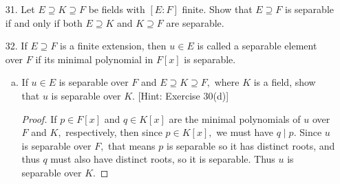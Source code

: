\documentclass{article}
\begin{document}
\begin{itemize}
\begin{enumerate}[(a)]
			\item If $E=F(E^p)$ and $\left\{ w_1, \cdots, w_k \right\}\subseteq E$ is $F$-independent, show that $\left\{ w_1^p, \cdots, w_k^p \right\}$ is $F$-independent. [Hint: Extend to a basis $\left\{ w_1, \cdots, w_{k}, \cdots, w_n \right\}$ of $E,$ show that $\left\{ w_1^p, \cdots, w_k^p, \cdots, w_n^p \right\}$ span $E,$ and apply Theorem 7 $\S$6.1.]
				\begin{proof}
					Extend $\left\{ w_1, \cdots w_k \right\}$ to an $F$-basis $\left\{ w_1, \cdots, w_k, \cdots, w_n \right\}$ of $E.$ Now if $v\in E=F(E^p),$ then suppose 
					\[v=\sum_{i=1}^{m} a_i u_i^p\]
					where $a_i\in F$ and $u_i\in E$ for all $i.$ Then since $\left\{ w_1,\cdots, w_k, \cdots, w_n \right\}$ is a basis, there is a unique representation for $u_i$ in terms of these basis elements:
					\begin{align*}
						v &= \sum_{i=1}^{m} a_i u_i^p = \sum_{i=1}^{m} a_i \left( \sum_{j=1}^{n} b_{ij} w_j \right)^p = \sum_{i=1}^{m} \sum_{j=1}^{n}a_i b_{ij}^p w_j^p
					\end{align*}
					Thus, the set $\left\{ w_1^p, \cdots, w_k^p, \cdots , w_n^p \right\}$ spans $E.$ Since $\left\{ w_1, \cdots, w_k, \cdots, w_n \right\}$ was a basis, $\dim E=n$ so $\left\{ w_1^p, \cdots, w_k^p, \cdots, w_n^p \right\}$ is $F$-independent.
				\end{proof}

		\end{enumerate}

	\item[31.] Let $E\supseteq K\supseteq F$ be fields with $[E:F]$ finite. Show that $E\supseteq F$ is separable if and only if both $E\supseteq K$ and $K\supseteq F$ are separable.

	\item[32.] If $E\supseteq F$ is a finite extension, then $u\in E$ is called a separable element over $F$ if its minimal polynomial in $F[x]$ is separable. 
		\begin{enumerate}[(a)]
			\item If $u\in E$ is separable over $F$ and $E\supseteq K\supseteq F,$ where $K$ is a field, show that $u$ is separable over $K.$ [Hint: Exercise 30(d)]
				\begin{proof}
					If $p\in F[x]$ and $q\in K[x]$ are the minimal polynomials of $u$ over $F$ and $K,$ respectively, then since $p\in K[x],$ we must have $q\mid p.$ Since $u$ is separable over $F,$ that means $p$ is separable so it has distinct roots, and thus $q$ must also have distinct roots, so it is separable. Thus $u$ is separable over $K.$
				\end{proof}
			

\end{enumerate}
\end{itemize}
\end{document}

